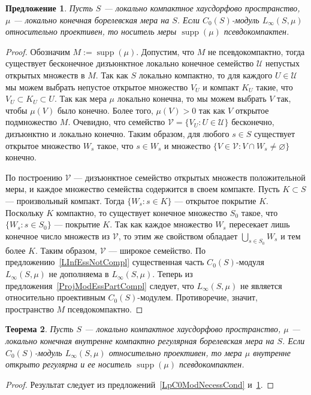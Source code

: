 \documentclass[12pt]{article}
\newtheorem{theorem}{Теорема}[section]
\newtheorem{proposition}[theorem]{Предложение}
\begin{document}
\begin{proposition}\label{LInfRelProjSuppCond} Пусть $S$ --- локально компактное
    хаусдорфово пространство, $\mu$ --- локально конечная борелевская мера на
    $S$. Если $C_0(S)$-модуль $L_\infty(S,\mu)$ относительно проективен, то
    носитель меры $\operatorname{supp}(\mu)$ псевдокомпактен.
\end{proposition}
\begin{proof} Обозначим $M:=\operatorname{supp}(\mu)$. Допустим, что $M$ не
    псевдокомпактно, тогда существует бесконечное дизъюнктное локально конечное
    семейство $\mathcal{U}$ непустых открытых множеств в $M$. Так как $S$
    локально компактно, то для каждого $U\in\mathcal{U}$ мы можем выбрать
    непустое открытое множество $V_U$ и компакт $K_U$ такие, что $V_U\subset
        K_U\subset  U$. Так как мера $\mu$ локально конечна, то мы можем выбрать $V$
    так, чтобы $\mu(V)$ было конечно. Более того, $\mu(V)>0$ так как $V$
    открытое подмножество $M$. Очевидно, что семейство
    $\mathcal{V}=\{V_U:U\in\mathcal{U}\}$ бесконечно, дизъюнктно и локально
    конечно. Таким образом, для любого $s\in S$ существует открытое множество
    $W_s$ такое, что $s\in W_s$ и множество $\{V\in\mathcal{V}: V\cap
        W_s\neq\varnothing \}$ конечно.

    По построению $\mathcal{V}$ --- дизъюнктное семейство открытых множеств
    положительной меры, и каждое множество семейства содержится в своем
    компакте. Пусть $K\subset S$ --- произвольный компакт. Тогда $\{W_s:s\in
        K\}$ --- открытое покрытие $K$. Поскольку $K$ компактно, то существует
    конечное множество $S_0$ такое, что $\{W_s:s\in S_0\}$ --- покрытие $K$. Так
    как каждое множество $W_s$ пересекает лишь конечное число множеств из
    $\mathcal{V}$, то этим же свойством обладает $\bigcup_{s\in S_0}W_s$ и тем
    более $K$. Таким образом, $\mathcal{V}$ --- широкое семейство. По
    предложению~\ref{LInfEssNotCompl} существенная часть $C_0(S)$-модуля
    $L_\infty(S,\mu)$ не дополняема в $L_\infty(S,\mu)$. Теперь из
    предложения~\ref{ProjModEssPartCompl} следует, что $L_\infty(S,\mu)$ не
    является относительно проективным $C_0(S)$-модулем. Противоречие, значит,
    пространство $M$ псевдокомпактно.
\end{proof}

\begin{theorem}\label{LInfReProjNecessCond} Пусть $S$ --- локально компактное
    хаусдорфово пространство, $\mu$ --- локально конечная внутренне компактно
    регулярная борелевская мера на $S$. Если $C_0(S)$-модуль $L_\infty(S,\mu)$
    относительно проективен, то мера $\mu$ внутренне открыто регулярна и ее
    носитель $\operatorname{supp}(\mu)$ псевдокомпактен.

\end{theorem}
\begin{proof} Результат следует из предложений~\ref{LpC0ModNecessCond}
    и~\ref{LInfRelProjSuppCond}.
\end{proof}
\end{document}
